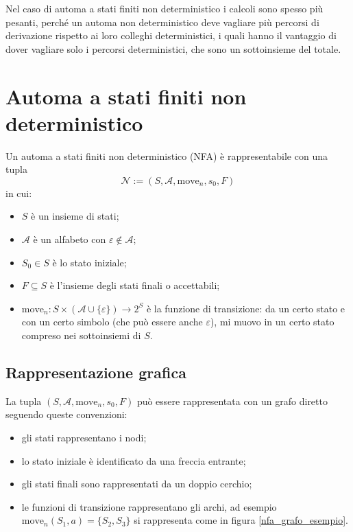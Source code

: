\documentclass[class=book, crop=false, oneside, 12pt]{standalone}
\begin{document}
Nel caso di automa a stati finiti non deterministico i calcoli sono spesso più pesanti, perché un automa non deterministico deve vagliare più percorsi di derivazione rispetto ai loro colleghi deterministici, i quali hanno il vantaggio di dover vagliare solo i percorsi deterministici, che sono un sottoinsieme del totale.

\section{Automa a stati finiti non deterministico}
Un automa a stati finiti non deterministico (NFA) è rappresentabile con una tupla
\begin{equation}
    \mathcal{N} := (S, \mathcal{A}, \textrm{move}_n, s_0, F)
    \label{nfa_tupla}
\end{equation}
in cui:
\begin{itemize}
    \item \(S\) è un insieme di stati;
    \item \(\mathcal{A}\) è un alfabeto con \(\varepsilon \notin \mathcal{A}\);
    \item \(S_0 \in S\) è lo stato iniziale;
    \item \(F \subseteq S\) è l’insieme degli stati finali o accettabili;
    \item \(\textrm{move}_n : S \times (\mathcal{A} \cup \{\varepsilon\}) \to 2^S\) è la funzione di transizione: da un certo stato e con un certo simbolo (che può essere anche \(\varepsilon\)), mi muovo in un certo stato compreso nei sottoinsiemi di \(S\).
\end{itemize}

\subsection{Rappresentazione grafica}
La tupla \((S, \mathcal{A}, \textrm{move}_n, s_0, F)\) può essere rappresentata con un grafo diretto seguendo queste convenzioni:
\begin{itemize}
    \item gli stati rappresentano i nodi;
    \item lo stato iniziale è identificato da una freccia entrante;
    \item gli stati finali sono rappresentati da un doppio cerchio;
    \item le funzioni di transizione rappresentano gli archi, ad esempio \(\textrm{move}_n(S_1, a) = \{S_2, S_3\}\) si rappresenta come in figura \ref{nfa_grafo_esempio}.
\end{itemize}
\end{document}
